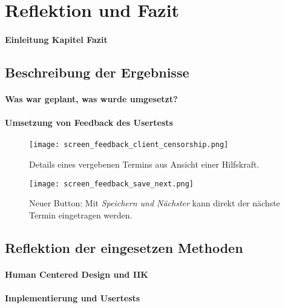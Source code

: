 \section{Reflektion und Fazit}
\paragraph{Einleitung Kapitel Fazit}

\subsection{Beschreibung der Ergebnisse}
\paragraph{Was war geplant, was wurde umgesetzt?}
\paragraph{Umsetzung von Feedback des Usertests}


\begin{figure}[H]
    \caption{Details eines vergebenen Termins aus Ansicht einer Hilfskraft.}
    \centering
    \texttt{[image: screen\_feedback\_client\_censorship.png]}
\end{figure}


\begin{figure}[H]
    \caption{Neuer Button: Mit \textit{Speichern und Nächster} kann direkt der nächste Termin eingetragen werden.}
    \centering
    \texttt{[image: screen\_feedback\_save\_next.png]}
\end{figure}


\subsection{Reflektion der eingesetzen Methoden}

\paragraph{Human Centered Design und IIK}

\paragraph{Implementierung und Usertests}

